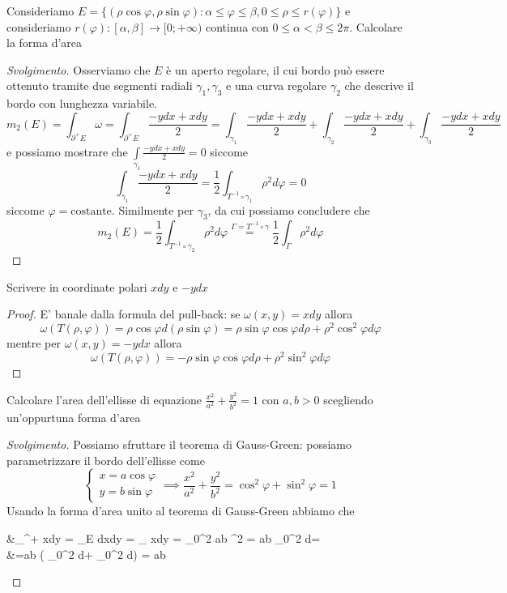 \begin{example}
	Consideriamo $E = \{(\rho \cos{\varphi}, \rho \sin{\varphi}) : \alpha \leq \varphi \leq \beta, 0 \leq \rho \leq r(\varphi) \}$ e consideriamo $r(\varphi) : [\alpha, \beta] \to [0; +\infty)$ continua con $0 \leq \alpha < \beta \leq 2 \pi$. Calcolare la forma d'area
\end{example}
\begin{proof}[Svolgimento]
	Osserviamo che $E$ è un aperto regolare, il cui bordo può essere ottenuto tramite due segmenti radiali $\gamma_1, \gamma_3$ e una curva regolare $\gamma_2$ che descrive il bordo con lunghezza variabile.
	$$
	m_2(E) = \int_{\partial^{+} E} \omega = \int_{\partial^{+} E} \frac{-ydx + xdy}{2} = \int_{\gamma_1} \frac{-ydx + xdy}{2} + \int_{\gamma_2} \frac{-ydx + xdy}{2} + \int_{\gamma_3} \frac{-ydx + xdy}{2}
	$$
	e possiamo mostrare che $
	\int\limits_{\gamma_1} \frac{-ydx + xdy}{2} = 0
	$
	siccome
	$$
	\int_{\gamma_1} \frac{-ydx + xdy}{2} = \frac{1}{2} \int_{T^{-1} \circ \gamma_1} \rho^2 d\varphi = 0 
	$$
	siccome $\varphi=\text{costante}$. Similmente per $\gamma_3$, da cui possiamo concludere che
	$$
	m_2(E) = \frac{1}{2} \int_{T^{-1} \circ \gamma_2} \rho^2 d\varphi \stackrel{\Gamma = T^{-1} \circ \gamma}{=} \frac{1}{2} \int_\Gamma \rho^2 d\varphi  
	$$
\end{proof}
\begin{exercise}
	Scrivere in coordinate polari $xdy$ e $-ydx$
\end{exercise}
\begin{proof}
	E' banale dalla formula del pull-back: se $\omega(x, y) = xdy$ allora
	$$
	\omega(T(\rho, \varphi)) = \rho \cos{\varphi} d(\rho \sin{\varphi}) = \rho \sin{\varphi} \cos{\varphi} d\rho + \rho^2 \cos^2{\varphi} d\varphi  
	$$
	mentre per $\omega(x, y) = -ydx$ allora
	$$
	\omega(T(\rho, \varphi)) = -\rho \sin{\varphi} \cos{\varphi} d\rho + \rho^2 \sin^2{\varphi} d\varphi  
	$$
\end{proof}
\begin{exercise}
	Calcolare l'area dell'ellisse di equazione $\frac{x^2}{a^2} + \frac{y^2}{b^2} = 1$ con $a, b > 0$ scegliendo un'oppurtuna forma d'area
\end{exercise}
\begin{proof}[Svolgimento]
	Possiamo sfruttare il teorema di Gauss-Green: possiamo parametrizzare il bordo dell'ellisse come
	$$
	\begin{cases}
		x = a \cos{\varphi} \\
		y = b \sin{\varphi}
	\end{cases} \implies \frac{x^2}{a^2} + \frac{y^2}{b^2} = \cos^2{\varphi} + \sin^2{\varphi} = 1
	$$
	Usando la forma d'area unito al teorema di Gauss-Green abbiamo che
	\begin{flalign*}
	&\int_{\partial^{+} \Omega} xdy = \int_E dxdy = \int_{\gamma} xdy = \int_0^{2\pi} ab \cos^2{\varphi} = ab \int_0^{2\pi} d\varphi = \\
	&=ab \left( \int_0^{2\pi}  d\varphi +  \int_0^{2\pi} \cos{2\varphi} d\varphi \right) = \pi ab
	\end{flalign*}
\end{proof}
